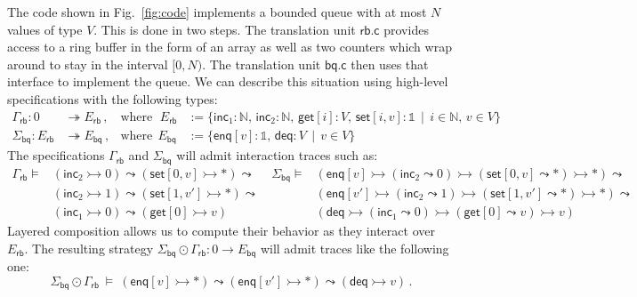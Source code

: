 \documentclass[acmsmall,nonacm]{acmart}
\newcommand{\kw}[1]{\ensuremath{ \mathsf{#1} }}
\newcommand{\emptysig}{0}
\newcommand{\mathbbm}[1]{\mathds{#1}}
\begin{document}
\begin{example} \label{ex:bq} %
The code shown in Fig.~\ref{fig:code}
implements a bounded queue
with at most $N$ values of type $V$.
This is done in two steps.
The translation unit $\kw{rb.c}$
provides access to a ring buffer
in the form of an array as well as
two counters which wrap around
to stay in the interval $[0, N)$.
The translation unit $\kw{bq.c}$ then uses that interface
to implement the queue.
We can describe this situation using
high-level specifications with the following types:
\begin{align*}
  \Gamma_\kw{rb} : \emptysig &\twoheadrightarrow E_\kw{rb} \,,
  & \text{where} \:\:\,
  E_\kw{rb} &:= \{
    \kw{inc}_1 \mathbin: \mathbb{N}, \,
    \kw{inc}_2 \mathbin: \mathbb{N}, \,
    \kw{get}[i] \mathbin: V, \,
    \kw{set}[i, v] \mathbin: \mathbbm{1} \, \mid \,
    i \in \mathbb{N}, \, v \in V
  \}
  \\
  \Sigma_\kw{bq} : E_\kw{rb} &\twoheadrightarrow E_\kw{bq} \,,
  & \text{where} \:\:
  E_\kw{bq} &:= \{
    \kw{enq}[v] \mathbin: \mathbbm{1}, \,
    \kw{deq} \mathbin: V \, \mid \,
    v \in V
  \}
\end{align*}
The specifications $\Gamma_\kw{rb}$ and $\Sigma_\kw{bq}$
will admit interaction traces such as:
{\small \begin{align*}
  \Gamma_\kw{rb} \vDash {} &
    (\kw{inc}_2 \rightarrowtail 0) \leadsto
    (\kw{set}[0, v] \rightarrowtail {*}) \leadsto &
  \:
  \Sigma_\kw{bq} \vDash {} &
    (\kw{enq}[v] \rightarrowtail
      (\kw{inc}_2 \leadsto 0) \rightarrowtail
      (\kw{set}[0, v] \leadsto {*}) \rightarrowtail
      {*}) \leadsto
  \\&
    (\kw{inc}_2 \rightarrowtail 1) \leadsto
    (\kw{set}[1, v'] \rightarrowtail {*}) \leadsto
  &&
    (\kw{enq}[v'] \rightarrowtail
      (\kw{inc}_2 \leadsto 1) \rightarrowtail
      (\kw{set}[1, v'] \leadsto {*}) \rightarrowtail
      {*}) \leadsto
  \\&
    (\kw{inc}_1 \rightarrowtail 0) \leadsto
    (\kw{get}[0] \rightarrowtail v)
  &&
    (\kw{deq} \rightarrowtail
      (\kw{inc}_1 \leadsto 0) \rightarrowtail
      (\kw{get}[0] \leadsto v) \rightarrowtail
      v)
\end{align*}}%
Layered composition allows us to compute their behavior
as they interact over $E_\kw{rb}$.
The resulting strategy
$\Sigma_\kw{bq} \odot \Gamma_\kw{rb} :
 \emptysig \rightarrow E_\kw{bq}$
will admit traces like the following one:
\[
  \Sigma_\kw{bq} \odot \Gamma_\kw{rb} \: \vDash \:
    (\kw{enq}[v] \rightarrowtail {*}) \leadsto
    (\kw{enq}[v'] \rightarrowtail {*}) \leadsto
    (\kw{deq} \rightarrowtail v)
  \,.
\]
\end{example}
\end{document}
